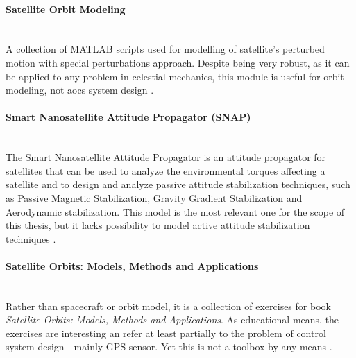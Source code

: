         \paragraph*{Satellite Orbit Modeling}\hspace{0pt}\\[0.1cm]
            A collection of MATLAB scripts used for modelling of satellite's perturbed motion with special perturbations approach. Despite being very robust, as it can be applied to any problem in celestial mechanics, this module is useful for orbit modeling, not \ac{aocs} system design \cite{som-matlab}.
            
        \paragraph*{Smart Nanosatellite Attitude Propagator (SNAP)}\hspace{0pt}\\[0.1cm]
            The Smart Nanosatellite Attitude Propagator is an attitude propagator for satellites that can be used to analyze the environmental torques affecting a satellite and to design and analyze passive attitude stabilization techniques, such as Passive Magnetic Stabilization, Gravity Gradient Stabilization and Aerodynamic stabilization. This model is the most relevant one for the scope of this thesis, but it lacks possibility to model active attitude stabilization techniques \cite{snap}.

        \paragraph*{Satellite Orbits: Models, Methods and Applications}\hspace{0pt}\\[0.1cm]
            Rather than spacecraft or orbit model, it is a collection of exercises for book \textit{Satellite Orbits: Models, Methods and Applications}. As educational means, the exercises are interesting an refer at least partially to the problem of control system design - mainly GPS sensor. Yet this is not a toolbox by any means \cite{orbitsaddon}.
        
